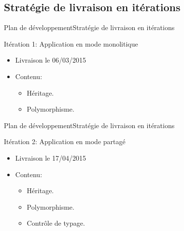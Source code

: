   \subsection{Stratégie de livraison en itérations}
    \begin{frame}{Plan de développement}{Stratégie de livraison en itérations}
      \begin{block}{Itération 1: Application en mode monolitique}
        
           \begin{itemize}
             \item<1-> Livraison le 06/03/2015
             \item<2-> Contenu: 
              \begin{itemize}
                \item<3-> Héritage.
                \item<4-> Polymorphisme.
              \end{itemize}
           \end{itemize}
        
      \end{block}
    \end{frame}
    \begin{frame}{Plan de développement}{Stratégie de livraison en itérations}
      \begin{block}{Itération 2: Application en mode partagé}
       
           \begin{itemize}
             \item<1-> Livraison le 17/04/2015
             \item<2-> Contenu:
              \begin{itemize}
                \item<3-> Héritage.
                \item<4-> Polymorphisme.
                \item<5-> Contrôle de typage.
              \end{itemize}
           \end{itemize}
        
      \end{block}
    \end{frame}

